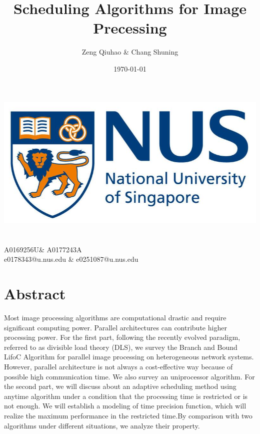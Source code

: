 \documentclass[twocolumn]{article}
\title{Scheduling Algorithms for Image Precessing }
\author{Zeng Qiuhao \& Chang Shuning}
\date{\today}
\begin{document}
\makeatletter
    \begin{titlepage}
        \begin{center}
        \vspace*{20mm}
            \includegraphics[width=0.7\linewidth]{walala.jpg}\\[20ex]
            {\huge \bfseries  \@title }\\[5ex] 
            {\LARGE  \@author}\\[4ex] 
            {\LARGE  A0169256U\& A0177243A}\\[4ex] 
            {\LARGE  e0178343@u.nus.edu \& e0251087@u.nus.edu}\\[40ex] 
            {\large \@date}
        \end{center}
    \end{titlepage}
\makeatother
\thispagestyle{empty}
\newpage
\section{Abstract}
Most image processing algorithms are computational drastic and require significant computing power. Parallel architectures can contribute higher processing power. For the first part, following the recently evolved paradigm, referred to as divisible load theory (DLS), we survey the Branch and Bound LifoC Algorithm for parallel image processing on heterogeneous network systems. However, parallel architecture is not always a cost-effective way because of possible high communication time. We also survey an uniprocessor algorithm. 
For the second part, we will discuss about an adaptive scheduling method using anytime algorithm under a condition that the processing time is restricted or is not enough. We will establish a modeling of time precision function, which will realize the maximum performance in the restricted time.By comparison with two algorithms under different situations, we analyze their property.
\end{document}
